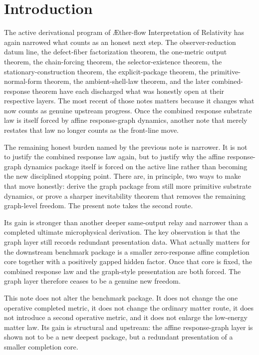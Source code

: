 \documentclass[11pt]{article}
\newcommand{\Aflow}{\AE{}ther-flow}
\newcommand{\TheoryName}{\Aflow{} Interpretation of Relativity}
\begin{document}
\section{Introduction}

The active derivational program of \TheoryName{} has again narrowed what counts as an honest next step. The observer-reduction datum line, the defect-fiber factorization theorem, the one-metric output theorem, the chain-forcing theorem, the selector-existence theorem, the stationary-construction theorem, the explicit-package theorem, the primitive-normal-form theorem, the ambient-shell-law theorem, and the later combined-response theorem have each discharged what was honestly open at their respective layers. The most recent of those notes matters because it changes what now counts as genuine upstream progress. Once the combined response substrate law is itself forced by affine response-graph dynamics, another note that merely restates that law no longer counts as the front-line move.

The remaining honest burden named by the previous note is narrower. It is not to justify the combined response law again, but to justify why the affine response-graph dynamics package itself is forced on the active line rather than becoming the new disciplined stopping point. There are, in principle, two ways to make that move honestly: derive the graph package from still more primitive substrate dynamics, or prove a sharper inevitability theorem that removes the remaining graph-level freedom. The present note takes the second route.

Its gain is stronger than another deeper same-output relay and narrower than a completed ultimate microphysical derivation. The key observation is that the graph layer still records redundant presentation data. What actually matters for the downstream benchmark package is a smaller zero-response affine completion core together with a positively gapped hidden factor. Once that core is fixed, the combined response law and the graph-style presentation are both forced. The graph layer therefore ceases to be a genuine new freedom.

This note does not alter the benchmark package. It does not change the one operative completed metric, it does not change the ordinary matter route, it does not introduce a second operative metric, and it does not enlarge the low-energy matter law. Its gain is structural and upstream: the affine response-graph layer is shown not to be a new deepest package, but a redundant presentation of a smaller completion core.
\end{document}
